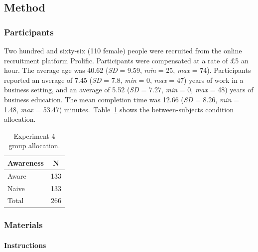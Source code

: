 \documentclass[a4paper, nobind, dvipsnames]{templates/ociamthesis}
\theoremstyle{definition}
\theoremstyle{definition}
\theoremstyle{definition}
\theoremstyle{definition}
\theoremstyle{remark}
\begin{document}
\hypertarget{method-9}{%
\subsection{Method}\label{method-9}}

\hypertarget{participants-8}{%
\subsubsection{Participants}\label{participants-8}}

Two hundred and sixty-six (110 female) people were recruited from the online recruitment platform Prolific. Participants were compensated at a rate of £5 an hour. The average age was 40.62 (\emph{SD} = 9.59, \emph{min} = 25, \emph{max} = 74). Participants reported an average of 7.45 (\emph{SD} = 7.8, \emph{min} = 0, \emph{max} = 47) years of work in a business setting, and an average of 5.52 (\emph{SD} = 7.27, \emph{min} = 0, \emph{max} = 48) years of business education. The mean completion time was 12.66 (\emph{SD} = 8.26, \emph{min} = 1.48, \emph{max} = 53.47) minutes.~Table~\ref{tab:condition-allocation-aggregation-4}
shows the between-subjects condition allocation.

\begin{table}[tbp]

\begin{center}
\begin{threeparttable}

\caption{\label{tab:condition-allocation-aggregation-4}Experiment 4 group allocation.}

\begin{tabular}{ll}
\toprule
Awareness & \multicolumn{1}{c}{N}\\
\midrule
Aware & 133\\
Naive & 133\\
Total & 266\\
\bottomrule
\end{tabular}

\end{threeparttable}
\end{center}

\end{table}

\hypertarget{materials-8}{%
\subsubsection{Materials}\label{materials-8}}

\hypertarget{instructions-6}{%
\paragraph{Instructions}\label{instructions-6}}
\end{document}
